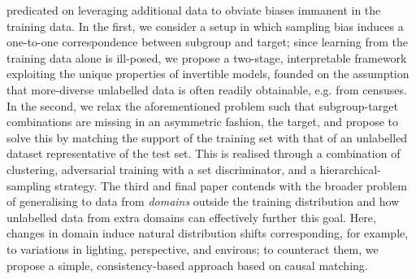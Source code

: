 predicated on leveraging additional data to obviate biases immanent in the training data.
%
In the first, we consider a setup in which sampling bias induces a one-to-one correspondence
between subgroup and target; since learning from the training data alone is ill-posed, we propose
a two-stage, interpretable framework exploiting the unique properties of invertible models, founded
on the assumption that more-diverse unlabelled data is often readily obtainable, e.g. from
censuses.
%
In the second, we relax the aforementioned problem such that subgroup-target combinations are
missing in an asymmetric fashion, \wrt{} the target, and propose to solve this by matching the
support of the training set with that of an unlabelled dataset representative of the test set. 
%
This is realised through a combination of clustering, adversarial training with a set
discriminator, and a hierarchical-sampling strategy.
%
The third and final paper contends with the broader problem of generalising to data from
\emph{domains} outside the training distribution  and how unlabelled data from extra domains can
effectively further this goal.
%
Here, changes in domain induce natural distribution shifts corresponding, for example, to
variations in lighting, perspective, and environs; to counteract them, we propose a simple,
consistency-based approach based on causal matching.


\endgroup

\vfill
